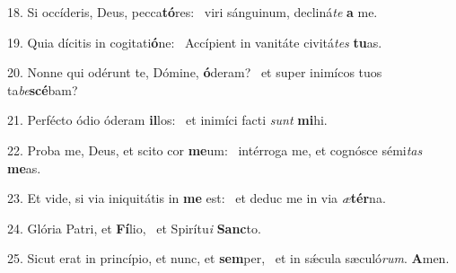 18. Si occíderis, Deus, pecca\textbf{tó}res: \ast\  viri sánguinum, decliná\textit{te} \textbf{a} me.\

19. Quia dícitis in cogitati\textbf{ó}ne: \ast\  Accípient in vanitáte civitá\textit{tes} \textbf{tu}as.\

20. Nonne qui odérunt te, Dómine, \textbf{ó}deram? \ast\  et super inimícos tuos ta\textit{be}\textbf{scé}bam?\

21. Perfécto ódio óderam \textbf{il}los: \ast\  et inimíci facti \textit{sunt} \textbf{mi}hi.\

22. Proba me, Deus, et scito cor \textbf{me}um: \ast\  intérroga me, et cognósce sémi\textit{tas} \textbf{me}as.\

23. Et vide, si via iniquitátis in \textbf{me} est: \ast\  et deduc me in via \textit{æ}\textbf{tér}na.\

24. Glória Patri, et \textbf{Fí}lio, \ast\  et Spirítu\textit{i} \textbf{Sanc}to.\

25. Sicut erat in princípio, et nunc, et \textbf{sem}per, \ast\  et in sǽcula sæculó\textit{rum}. \textbf{A}men.\


